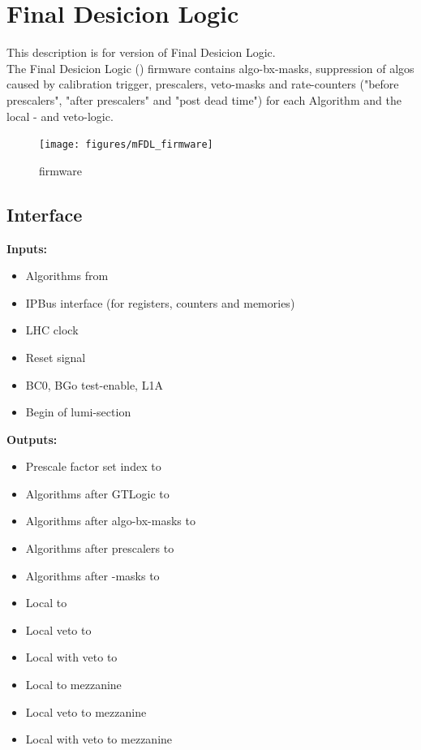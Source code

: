 \section{Final Desicion Logic}\label{sec:fdl:ufdl}

This description is for version \versionfdl of Final Desicion Logic.\\

The Final Desicion Logic (\ufdl) firmware contains algo-bx-masks, suppression of algos caused by calibration trigger, prescalers, veto-masks and rate-counters
("before prescalers", "after prescalers" and "post dead time") for each Algorithm and the local \finor- and veto-logic.

\begin{figure}[htb]
\centering
\texttt{[image: figures/mFDL\_firmware]}
\caption{\ufdl firmware}
\label{fig:fdl:mFDL_firmware}
\end{figure}

\subsection{\ufdl Interface}
\label{sec:fdl:ufdl_interface}


\textbf{Inputs:}
\begin{itemize}
\item Algorithms from \ugtl
\item IPBus interface (for registers, counters and memories)
\item LHC clock
\item Reset signal
\item BC0, BGo test-enable, L1A
\item Begin of lumi-section
\end{itemize}
\textbf{Outputs:}
\begin{itemize}
\item Prescale factor set index to \rop
\item Algorithms after GTLogic to \rop
\item Algorithms after algo-bx-masks to \rop
\item Algorithms after prescalers to \rop
\item Algorithms after \finor-masks to \rop
\item Local \finor to \rop
\item Local veto to \rop
\item Local \finor with veto to \rop
\item Local \finor to mezzanine
\item Local veto to mezzanine
\item Local \finor with veto to mezzanine
\end{itemize}

